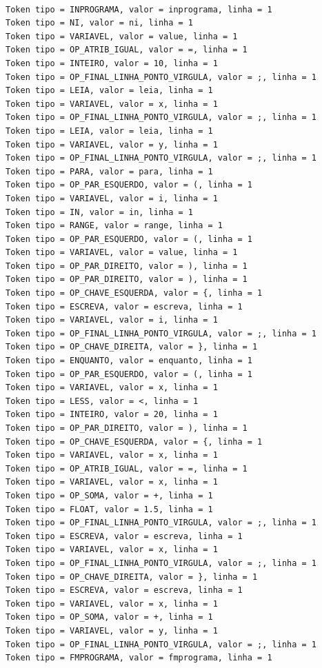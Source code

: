 \documentclass[a4paper,12pt]{article}
\begin{document}
\begin{verbatim}
    
Token tipo = INPROGRAMA, valor = inprograma, linha = 1
Token tipo = NI, valor = ni, linha = 1
Token tipo = VARIAVEL, valor = value, linha = 1
Token tipo = OP_ATRIB_IGUAL, valor = =, linha = 1
Token tipo = INTEIRO, valor = 10, linha = 1
Token tipo = OP_FINAL_LINHA_PONTO_VIRGULA, valor = ;, linha = 1
Token tipo = LEIA, valor = leia, linha = 1
Token tipo = VARIAVEL, valor = x, linha = 1
Token tipo = OP_FINAL_LINHA_PONTO_VIRGULA, valor = ;, linha = 1
Token tipo = LEIA, valor = leia, linha = 1
Token tipo = VARIAVEL, valor = y, linha = 1
Token tipo = OP_FINAL_LINHA_PONTO_VIRGULA, valor = ;, linha = 1
Token tipo = PARA, valor = para, linha = 1
Token tipo = OP_PAR_ESQUERDO, valor = (, linha = 1
Token tipo = VARIAVEL, valor = i, linha = 1
Token tipo = IN, valor = in, linha = 1
Token tipo = RANGE, valor = range, linha = 1
Token tipo = OP_PAR_ESQUERDO, valor = (, linha = 1
Token tipo = VARIAVEL, valor = value, linha = 1
Token tipo = OP_PAR_DIREITO, valor = ), linha = 1
Token tipo = OP_PAR_DIREITO, valor = ), linha = 1
Token tipo = OP_CHAVE_ESQUERDA, valor = {, linha = 1
Token tipo = ESCREVA, valor = escreva, linha = 1
Token tipo = VARIAVEL, valor = i, linha = 1
Token tipo = OP_FINAL_LINHA_PONTO_VIRGULA, valor = ;, linha = 1
Token tipo = OP_CHAVE_DIREITA, valor = }, linha = 1
Token tipo = ENQUANTO, valor = enquanto, linha = 1
Token tipo = OP_PAR_ESQUERDO, valor = (, linha = 1
Token tipo = VARIAVEL, valor = x, linha = 1
Token tipo = LESS, valor = <, linha = 1
Token tipo = INTEIRO, valor = 20, linha = 1
Token tipo = OP_PAR_DIREITO, valor = ), linha = 1
Token tipo = OP_CHAVE_ESQUERDA, valor = {, linha = 1
Token tipo = VARIAVEL, valor = x, linha = 1
Token tipo = OP_ATRIB_IGUAL, valor = =, linha = 1
Token tipo = VARIAVEL, valor = x, linha = 1
Token tipo = OP_SOMA, valor = +, linha = 1
Token tipo = FLOAT, valor = 1.5, linha = 1
Token tipo = OP_FINAL_LINHA_PONTO_VIRGULA, valor = ;, linha = 1
Token tipo = ESCREVA, valor = escreva, linha = 1
Token tipo = VARIAVEL, valor = x, linha = 1
Token tipo = OP_FINAL_LINHA_PONTO_VIRGULA, valor = ;, linha = 1
Token tipo = OP_CHAVE_DIREITA, valor = }, linha = 1
Token tipo = ESCREVA, valor = escreva, linha = 1
Token tipo = VARIAVEL, valor = x, linha = 1
Token tipo = OP_SOMA, valor = +, linha = 1
Token tipo = VARIAVEL, valor = y, linha = 1
Token tipo = OP_FINAL_LINHA_PONTO_VIRGULA, valor = ;, linha = 1
Token tipo = FMPROGRAMA, valor = fmprograma, linha = 1
\end{verbatim}
\end{document}
